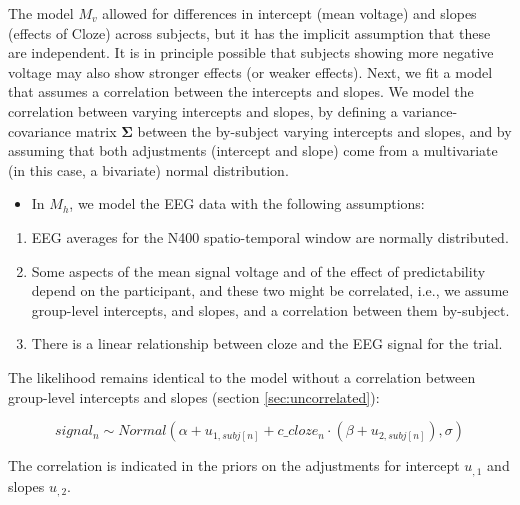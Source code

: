 \documentclass[12pt,]{krantz}
\providecommand{\tightlist}{%
  \setlength{\itemsep}{0pt}\setlength{\parskip}{0pt}}
\theoremstyle{definition}
\theoremstyle{definition}
\theoremstyle{definition}
\theoremstyle{remark}
\begin{document}
The model \(M_{v}\) allowed for differences in intercept (mean voltage) and slopes (effects of Cloze) across subjects, but it has the implicit assumption that these are independent. It is in principle possible that subjects showing more negative voltage may also show stronger effects (or weaker effects). Next, we fit a model that assumes a correlation between the intercepts and slopes. We model the correlation between varying intercepts and slopes, by defining a variance-covariance matrix \(\boldsymbol{\Sigma}\) between the by-subject varying intercepts and slopes, and by assuming that both adjustments (intercept and slope) come from a multivariate (in this case, a bivariate) normal distribution.

\begin{itemize}
\tightlist
\item
  In \(M_h\), we model the EEG data with the following assumptions:
\end{itemize}

\begin{enumerate}
\def\labelenumi{\arabic{enumi}.}
\tightlist
\item
  EEG averages for the N400 spatio-temporal window are normally distributed.
\item
  Some aspects of the mean signal voltage and of the effect of predictability depend on the participant, and these two might be correlated, i.e., we assume group-level intercepts, and slopes, and a correlation between them by-subject.
\item
  There is a linear relationship between cloze and the EEG signal for the trial.
\end{enumerate}

The likelihood remains identical to the model without a correlation between group-level intercepts and slopes (section \ref{sec:uncorrelated}):

\begin{equation}
  signal_n \sim Normal(\alpha + u_{1,subj[n]} + c\_cloze_n \cdot  (\beta + u_{2,subj[n]}),\sigma)
  \end{equation}

The correlation is indicated in the priors on the adjustments for intercept \(u_{,1}\) and slopes \(u_{,2}\).
\end{document}
